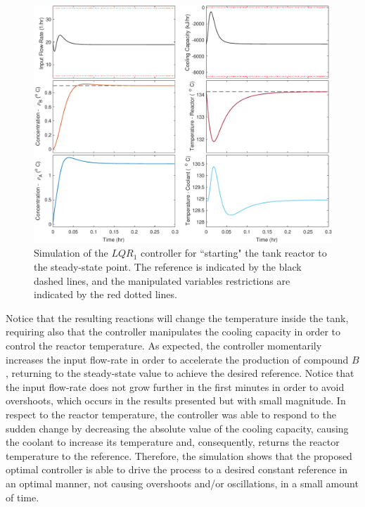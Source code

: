 \documentclass[a4paper,11pt]{book}
\numberwithin{figure}{chapter}
\numberwithin{equation}{chapter}
\numberwithin{table}{chapter}
\theoremstyle{definition}
\begin{document}
\begin{figure}[ht] \centering
	\includegraphics[width=\textwidth]{chapter7/lqr01}
	
	\caption{Simulation of the $LQR_1$ controller for ``starting" the tank reactor to the steady-state point. The reference is indicated by the black dashed lines, and the manipulated variables restrictions are indicated by the red dotted lines.}
	\label{fig:lqr01}
\end{figure}

Notice that the resulting reactions will change the temperature inside the tank, requiring also that the controller manipulates the cooling capacity in order to control the reactor temperature. As expected, the controller momentarily increases the input flow-rate in order to accelerate the production of compound $B$, returning to the steady-state value to achieve the desired reference. Notice that the input flow-rate does not grow further in the first minutes in order to avoid overshoots, which occurs in the results presented but with small magnitude. In respect to the reactor temperature, the controller was able to respond to the sudden change by decreasing the absolute value of the cooling capacity, causing the coolant to increase its temperature and, consequently, returns the reactor temperature to the reference. Therefore, the simulation shows that the proposed optimal controller is able to drive the process to a desired constant reference in an optimal manner, not causing overshoots and/or oscillations, in a small amount of time.
\end{document}
